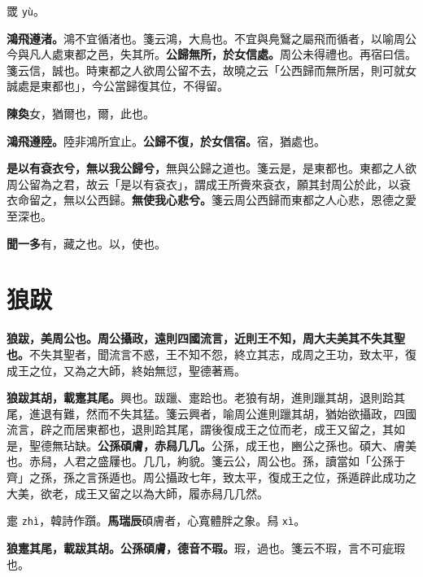 \begin{quoting}罭 \texttt{yù}。\end{quoting}

\textbf{鴻飛遵渚。}{\footnotesize 鴻不宜循渚也。箋云鴻，大鳥也。不宜與鳧鷖之屬飛而循者，以喻周公今與凡人處東都之邑，失其所。}\textbf{公歸無所，於女信處。}{\footnotesize 周公未得禮也。再宿曰信。箋云信，誠也。時東都之人欲周公留不去，故曉之云「公西歸而無所居，則可就女誠處是東都也」，今公當歸復其位，不得留。}

\begin{quoting}\textbf{陳奐}女，猶爾也，爾，此也。\end{quoting}

\textbf{鴻飛遵陸。}{\footnotesize 陸非鴻所宜止。}\textbf{公歸不復，於女信宿。}{\footnotesize 宿，猶處也。}

\textbf{是以有袞衣兮，無以我公歸兮，}{\footnotesize 無與公歸之道也。箋云是，是東都也。東都之人欲周公留為之君，故云「是以有袞衣」，謂成王所賫來袞衣，願其封周公於此，以袞衣命留之，無以公西歸。}\textbf{無使我心悲兮。}{\footnotesize 箋云周公西歸而東都之人心悲，恩德之愛至深也。}

\begin{quoting}\textbf{聞一多}有，藏之也。以，使也。\end{quoting}

\section{狼跋}


\textbf{狼跋，美周公也。周公攝政，遠則四國流言，近則王不知，周大夫美其不失其聖也。}{\footnotesize 不失其聖者，聞流言不惑，王不知不怨，終立其志，成周之王功，致太平，復成王之位，又為之大師，終始無愆，聖德著焉。}

\textbf{狼跋其胡，載疐其尾。}{\footnotesize 興也。跋躐、疐跲也。老狼有胡，進則躐其胡，退則跲其尾，進退有難，然而不失其猛。箋云興者，喻周公進則躐其胡，猶始欲攝政，四國流言，辟之而居東都也，退則跲其尾，謂後復成王之位而老，成王又留之，其如是，聖德無玷缺。}\textbf{公孫碩膚，赤舄几几。}{\footnotesize 公孫，成王也，豳公之孫也。碩大、膚美也。赤舄，人君之盛屨也。几几，絇貌。箋云公，周公也。孫，讀當如「公孫于齊」之孫，孫之言孫遁也。周公攝政七年，致太平，復成王之位，孫遁辟此成功之大美，欲老，成王又留之以為大師，履赤舄几几然。}

\begin{quoting}疐 \texttt{zhì}，韓詩作躓。\textbf{馬瑞辰}碩膚者，心寬體胖之象。舄 \texttt{xì}。\end{quoting}

\textbf{狼疐其尾，載跋其胡。公孫碩膚，德音不瑕。}{\footnotesize 瑕，過也。箋云不瑕，言不可疵瑕也。}

